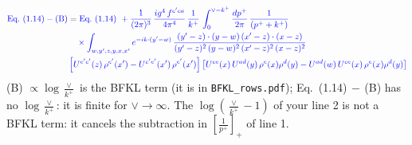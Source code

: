 \documentclass[9pt]{article}
\numberwithin{equation}{section}
\begin{document}
\begin{align*}
{\color{blue}\text{Eq.~(1.14)} - \text{(B)}} &= \color{blue}\text{Eq.~(1.14)}\ +\frac{1}{(2\pi)^{3}}\, \frac{ig^{4}\,f^{c'ca}}{4\pi^{4}}\, \frac{1}{k^{+}}\,\int_{0}^{\vee-k^{+}}\frac{dp^{+}}{2\pi}\,\frac{1}{(p^{+}+k^{+})}\\ & \color{blue} \quad\times\int_{w,y',z,y,x,x'} e^{-ik\cdot (y'-w)}\,\frac{(y'-z)\cdot (y-w)\,(x'-z)\cdot (x-z)}{(y'-z)^{2}\,(y-w)^{2}\,(x'-z)^{2}\,(x-z)^{2}}\notag \\
& \color{blue}  \left[U^{e'c'}(z)\,\rho^{e'}(x')-U^{c'e'}(x')\,\rho^{e'}(x')\right]\left[U^{ce}(x)\,U^{ad}(y)\,\rho^{e}(x)\rho^{d}(y)-U^{ad}(w)\,U^{ce}(x)\,\rho^{e}(x)\rho^{d}(y)\right]
\end{align*}
{\color{blue}\noindent (B) $\propto\log\frac{\vee}{k^+}$ is the BFKL term (it is in \texttt{BFKL\_rows.pdf}); Eq.~(1.14)$\,-\,$(B) has no $\log\frac{\vee}{k^+}$: it is finite for $\vee\to\infty$. The $\log(\frac{\vee}{k^+}-1)$ of your line 2 is not a BFKL term: it cancels the subtraction in $\left[\frac{1}{p^+}\right]_+$ of line 1.}
\end{document}
